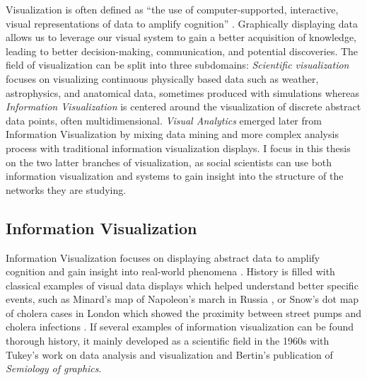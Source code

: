 Visualization is often defined as ``the use of computer-supported, interactive, visual representations of data to amplify cognition'' \cite{cardReadingsInformationVisualization1999}.
Graphically displaying data allows us to leverage our visual system to gain a better acquisition of knowledge, leading to better decision-making, communication, and potential discoveries.
The field of visualization can be split into three subdomains: \textit{Scientific visualization} focuses on visualizing continuous physically based data such as weather, astrophysics, and anatomical data, sometimes produced with simulations whereas \textit{Information Visualization} is centered around the visualization of discrete abstract data points, often multidimensional. \textit{Visual Analytics} emerged later from Information Visualization by mixing data mining and more complex analysis process with traditional information visualization displays.
I focus in this thesis on the two latter branches of visualization, as social scientists can use both information visualization and \va systems to gain insight into the structure of the networks they are studying.


\subsection{Information Visualization}

Information Visualization focuses on displaying abstract data to amplify cognition and gain insight into real-world phenomena \cite{cardReadingsInformationVisualization1999}.
History is filled with classical examples of visual data displays which helped understand better specific events, such as Minard's map of Napoleon's march in Russia \cite{friendlyVisionsReVisionsCharles2002}, or Snow's dot map of cholera cases in London which showed the proximity between street pumps and cholera infections \cite{snowModeCommunicationCholera1856}.
If several examples of information visualization can be found thorough history, it mainly developed as a scientific field in the 1960s with Tukey's work on data analysis and visualization \cite{tukeyFutureDataAnalysis1962} and Bertin's publication of \textit{Semiology of graphics}\cite{bertin1967}.


